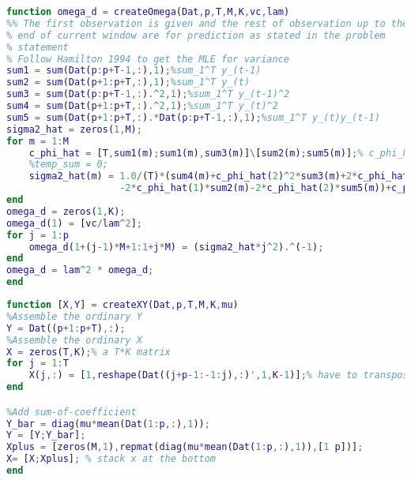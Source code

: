 \documentclass[11pt, oneside]{article}   	%
\begin{document}
\begin{appendices}
\begin{lstlisting}[language=Matlab ,caption={\textit{createOmega.m} creates $ \Omega$ for Minnesota prior.}, label={code:createOmega}]
function omega_d = createOmega(Dat,p,T,M,K,vc,lam)
%% The first observation is given and the rest of observation up to the
% end of current window are for prediction as stated in the problem
% statement
% Follow Hamilton 1994 to get the MLE for variance
sum1 = sum(Dat(p:p+T-1,:),1);%sum_1^T y_(t-1)
sum2 = sum(Dat(p+1:p+T,:),1);%sum_1^T y_(t)
sum3 = sum(Dat(p:p+T-1,:).^2,1);%sum_1^T y_(t-1)^2
sum4 = sum(Dat(p+1:p+T,:).^2,1);%sum_1^T y_(t)^2
sum5 = sum(Dat(p+1:p+T,:).*Dat(p:p+T-1,:),1);%sum_1^T y_(t)y_(t-1)
sigma2_hat = zeros(1,M);
for m = 1:M
    c_phi_hat = [T,sum1(m);sum1(m),sum3(m)]\[sum2(m);sum5(m)];% c_phi_hat = [c_hat,phi_hat]
    %temp_sum = 0;
    sigma2_hat(m) = 1.0/(T)*(sum4(m)+c_phi_hat(2)^2*sum3(m)+2*c_phi_hat(1)*c_phi_hat(2)*sum1(m)...
                    -2*c_phi_hat(1)*sum2(m)-2*c_phi_hat(2)*sum5(m))+c_phi_hat(1)^2;
end
omega_d = zeros(1,K);
omega_d(1) = [vc/lam^2];
for j = 1:p
    omega_d(1+(j-1)*M+1:1+j*M) = (sigma2_hat*j^2).^(-1);
end
omega_d = lam^2 * omega_d;
end
\end{lstlisting}

\begin{lstlisting}[language=Matlab ,caption={\textit{createXY.m} constructs matrix $X$ and $Y$ with sum-of-coefficient prior with dummy observations.}, label={code:createXY.m}]
function [X,Y] = createXY(Dat,p,T,M,K,mu)
%Assemble the ordinary Y
Y = Dat((p+1:p+T),:);
%Assemble the ordinary X
X = zeros(T,K);% a T*K matrix
for j = 1:T
    X(j,:) = [1,reshape(Dat((j+p-1:-1:j),:)',1,K-1)];% have to transpose because the reshape function operate in column
end

%Add sum-of-coefficient
Y_bar = diag(mu*mean(Dat(1:p,:),1));
Y = [Y;Y_bar];
Xplus = [zeros(M,1),repmat(diag(mu*mean(Dat(1:p,:),1)),[1 p])];    
X= [X;Xplus]; % stack x at the bottom
end
\end{lstlisting}


\end{appendices}
\end{document}
